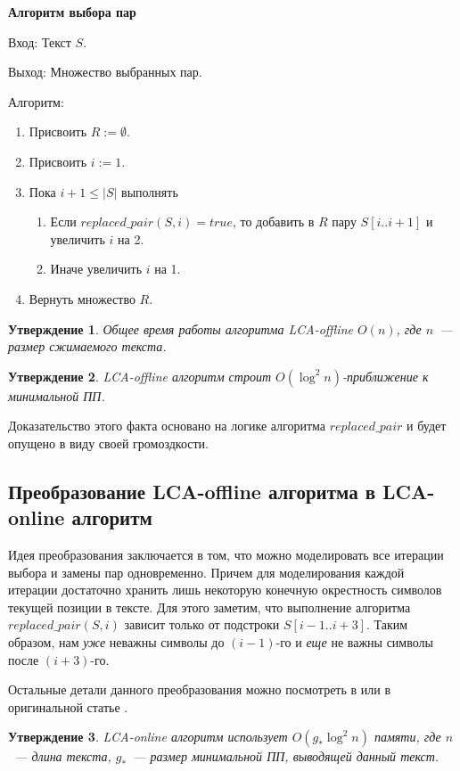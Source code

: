 \documentclass[14pt]{article}
\newtheorem{claim}{Утверждение}[section]
\begin{document}
{\bf Алгоритм выбора пар}

{\sc Вход:} Текст $S$.

{\sc Выход:} Множество выбранных пар.

{\sc Алгоритм:}

\begin{enumerate}
	\item Присвоить $R := \emptyset$.
	\item Присвоить $i := 1$.
	\item Пока $i + 1 \leq |S|$ выполнять
	\begin{enumerate}
		\item Если $replaced\_pair(S, i) = true$, то добавить в $R$ пару $S[i..i+1]$ и увеличить $i$ на 2.
		\item Иначе увеличить $i$ на 1.
	\end{enumerate}
	\item Вернуть множество $R$.
\end{enumerate}

\begin{claim}
	Общее время работы алгоритма LCA-offline $O(n)$, где $n$~--- размер сжимаемого текста.
\end{claim}

\begin{claim}
	LCA-offline алгоритм строит $O(\log^2 n)$-приближение к минимальной ПП.
\end{claim}

Доказательство этого факта основано на логике алгоритма $replaced\_pair$ и будет опущено в виду своей громоздкости.

\subsection{Преобразование LCA-offline алгоритма в LCA-online алгоритм}

Идея преобразования заключается в том, что можно моделировать все итерации выбора и замены пар одновременно.
Причем для моделирования каждой итерации достаточно хранить лишь некоторую конечную окрестность символов текущей позиции в тексте.
Для этого заметим, что выполнение алгоритма $replaced\_pair(S, i)$ зависит только от подстроки $S[i-1..i+3]$. Таким образом,
нам {\it уже} неважны символы до $(i-1)$-го и {\it еще} не важны символы после $(i+3)$-го.

Остальные детали данного преобразования можно посмотреть в \cite{MasterPaper} или в оригинальной статье \cite{LCAOnlineSLP}.

\begin{claim}
	LCA-online алгоритм использует $O(g_*\log^2n)$ памяти, где $n$~--- длина текста,
	$g_*$~--- размер минимальной ПП, выводящей данный текст.
\end{claim}
\end{document}
